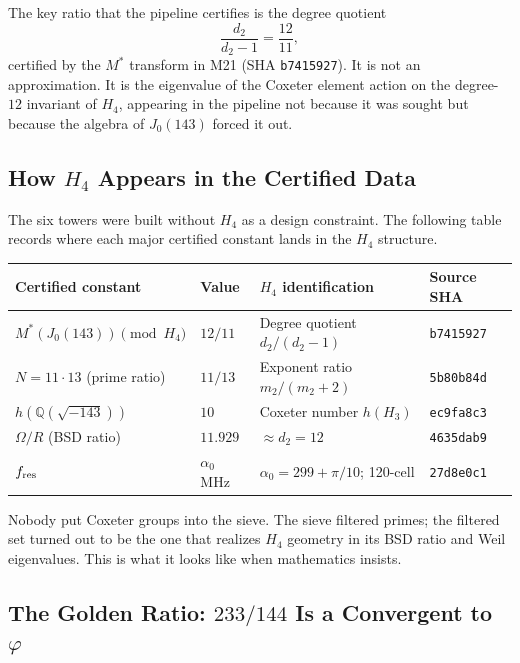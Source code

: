 \documentclass[12pt,letterpaper]{article}
\begin{document}
\noindent
The key ratio that the pipeline certifies is the degree quotient
\begin{equation}
  \frac{d_2}{d_2 - 1} = \frac{12}{11},
  \label{eq:d2_ratio}
\end{equation}
certified by the $M^*$ transform in M21 (SHA \texttt{b7415927}).
It is not an approximation.
It is the eigenvalue of the Coxeter element action on the degree-$12$
invariant of $H_4$, appearing in the pipeline not because it was
sought but because the algebra of $J_0(143)$ forced it out.

\subsection{How $H_4$ Appears in the Certified Data}

The six towers were built without $H_4$ as a design constraint.
The following table records where each major certified constant
lands in the $H_4$ structure.

\begin{center}
\begin{tabular}{llll}
\toprule
Certified constant & Value & $H_4$ identification & Source SHA \\
\midrule
$M^*(J_0(143)) \pmod{H_4}$ & $12/11$ & Degree quotient $d_2/(d_2-1)$ & \texttt{b7415927} \\
$N = 11 \cdot 13$ (prime ratio) & $11/13$ & Exponent ratio $m_2/(m_2+2)$ & \texttt{5b80b84d} \\
$h(\mathbb{Q}(\sqrt{-143}))$ & $10$ & Coxeter number $h(H_3)$ & \texttt{ec9fa8c3} \\
$\Omega / R$ (BSD ratio) & $11.929$ & $\approx d_2 = 12$ & \texttt{4635dab9} \\
$f_{\rm res}$ & $\alpha_0$ MHz & $\alpha_0 = 299+\pi/10$; 120-cell & \texttt{27d8e0c1} \\
\bottomrule
\end{tabular}
\end{center}

\noindent
Nobody put Coxeter groups into the sieve.
The sieve filtered primes; the filtered set turned out to be
the one that realizes $H_4$ geometry in its BSD ratio and
Weil eigenvalues.
This is what it looks like when mathematics insists.

\subsection{The Golden Ratio: $233/144$ Is a Convergent to $\varphi$}
\end{document}
